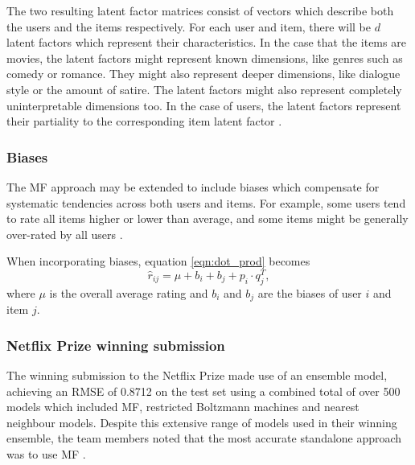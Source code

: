 The two resulting latent factor matrices consist of vectors which describe both the users and the items respectively. For each user and item, there will be $d$ latent factors which represent their characteristics. In the case that the items are movies, the latent factors might represent known dimensions, like genres such as comedy or romance. They might also represent deeper dimensions, like dialogue style or the amount of satire. The latent factors might also represent completely uninterpretable dimensions too. In the case of users, the latent factors represent their partiality to the corresponding item latent factor \parencite{koren2009matrix}.

\subsubsection{Biases}
The MF approach may be extended to include biases which compensate for systematic tendencies across both users and items. For example, some users tend to rate all items higher or lower than average, and some items might be generally over-rated by all users \parencite{koren2009matrix}.

When incorporating biases, equation \ref{eqn:dot_prod} becomes
\begin{equation}
    \hat{r}_{ij} = \mu + b_i + b_j + p_i \cdot q_j^T,
\label{eqn:dot_bias}
\end{equation}
where $\mu$ is the overall average rating and $b_i$ and $b_j$ are the biases of user $i$ and item $j$.

\subsubsection{Netflix Prize winning submission}
The winning submission to the Netflix Prize made use of an ensemble model, achieving an RMSE of 0.8712 on the test set using a combined total of over 500 models which included MF, restricted Boltzmann machines and nearest neighbour models. Despite this extensive range of models used in their winning ensemble, the team members noted that the most accurate standalone approach was to use MF \parencite{netflix_bellkor}. 

